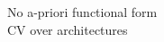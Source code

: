 \documentclass[preview]{standalone}
\begin{document}
No a-priori functional form\\CV over architectures\\
\end{document}
